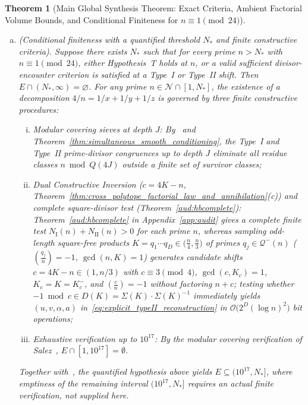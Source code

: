 \documentclass[11pt, a4paper]{article}
\theoremstyle{plain}
\newtheorem{theorem}{Theorem}[section]
\theoremstyle{definition}
\newcommand{\leg}[2]{\left(\frac{#1}{#2}\right)}
\newcommand{\I}{\mathrm{I}}
\newcommand{\II}{\mathrm{II}}
\begin{document}
\begin{theorem}[Main Global Synthesis Theorem: Exact Criteria, Ambient Factorial Volume Bounds, and Conditional Finiteness for $n\equiv1\pmod{24}$]
\begin{enumerate}[(a)]
    \item \emph{(Conditional finiteness with a quantified threshold $N_{\ast}$ and finite constructive criteria).} Suppose there exists $N_{\ast}$ such that for every prime $n>N_{\ast}$ with $n\equiv1\pmod{24}$, either Hypothesis~T holds at $n$, or a valid sufficient divisor-encounter criterion is satisfied at a Type~I or Type~II shift. Then $E\cap(N_{\ast},\infty)=\varnothing$. For any prime $n\in\mathcal{N}\cap[1,N_{\ast}]$, the existence of a decomposition $4/n=1/x+1/y+1/z$ is governed by three finite constructive procedures:
    \begin{enumerate}[(i)]
        \item \emph{Modular covering sieves at depth $J$:} By~\cite[Thm.~3.9 and Thm.~3.11]{dahan2026a} and Theorem~\ref{thm:simultaneous_smooth_conditioning}, the Type~I and Type~II prime-divisor congruences up to depth $J$ eliminate all residue classes $n\bmod Q(4J)$ outside a finite set of survivor classes;
        \item \emph{Dual Constructive Inversion ($c=4K-n$, Theorem~\ref{thm:cross_polytope_factorial_law_and_annihilation}(c)) and complete square-divisor test (Theorem~\ref{aud:hbcomplete}):} Theorem~\ref{aud:hbcomplete} in Appendix~\ref{app:audit} gives a complete finite test $N_{\I}(n)+N_{\II}(n)>0$ for each prime $n$, whereas sampling odd-length square-free products $K=q_1\cdots q_D\in\big(\frac{n}{4},\frac{n}{3}\big)$ of primes $q_j\in\mathcal{Q}^{-}(n)$ ($\leg{q_j}{n}=-1$, $\gcd(n,K)=1$) generates candidate shifts $c=4K-n\in(1,n/3)$ with $c\equiv3\pmod 4$, $\gcd(c,K_c)=1$, $K_c=K=K_c^{-}$, and $\leg{c}{n}=-1$ without factoring $n+c$; testing whether $-1\bmod c\in D(K)=\Sigma(K)\cdot\Sigma(K)^{-1}$ immediately yields $(u,v,\alpha,a)$ in~\eqref{eq:explicit_typeII_reconstruction} in $\mathcal{O}\big(2^{D}(\log n)^{2}\big)$ bit operations;
        \item \emph{Exhaustive verification up to $10^{17}$:} By the modular covering verification of Salez~\cite{salez2014}, $E\cap[1,10^{17}]=\emptyset$.
    \end{enumerate}
    Together with~\cite{salez2014}, the quantified hypothesis above yields $E\subseteq(10^{17},N_{\ast}]$, where emptiness of the remaining interval $(10^{17},N_{\ast}]$ requires an actual finite verification, not supplied here.
\end{enumerate}
\end{theorem}
\end{document}
